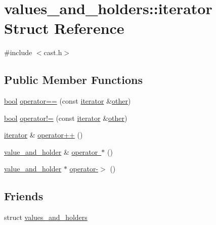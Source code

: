\hypertarget{structvalues__and__holders_1_1iterator}{}\section{values\+\_\+and\+\_\+holders\+::iterator Struct Reference}
\label{structvalues__and__holders_1_1iterator}


{\ttfamily \#include $<$cast.\+h$>$}

\subsection*{Public Member Functions}
\begin{DoxyCompactItemize}
\item 
\mbox{\hyperlink{asdl_8h_af6a258d8f3ee5206d682d799316314b1}{bool}} \mbox{\hyperlink{structvalues__and__holders_1_1iterator_a33067e3338236631faabd163015ecdeb}{operator==}} (const \mbox{\hyperlink{structvalues__and__holders_1_1iterator}{iterator}} \&\mbox{\hyperlink{dictobject_8h_abd4733e17e86acb453bda62bc8b96adf}{other}})
\item 
\mbox{\hyperlink{asdl_8h_af6a258d8f3ee5206d682d799316314b1}{bool}} \mbox{\hyperlink{structvalues__and__holders_1_1iterator_add38e28c3781eb444bede073da2f0161}{operator!=}} (const \mbox{\hyperlink{structvalues__and__holders_1_1iterator}{iterator}} \&\mbox{\hyperlink{dictobject_8h_abd4733e17e86acb453bda62bc8b96adf}{other}})
\item 
\mbox{\hyperlink{structvalues__and__holders_1_1iterator}{iterator}} \& \mbox{\hyperlink{structvalues__and__holders_1_1iterator_a5c088cc278f41cbae555f831cbdf2e38}{operator++}} ()
\item 
\mbox{\hyperlink{structvalue__and__holder}{value\+\_\+and\+\_\+holder}} \& \mbox{\hyperlink{structvalues__and__holders_1_1iterator_af5c40b3f93b79766c8da58d6831bf161}{operator $\ast$}} ()
\item 
\mbox{\hyperlink{structvalue__and__holder}{value\+\_\+and\+\_\+holder}} $\ast$ \mbox{\hyperlink{structvalues__and__holders_1_1iterator_a0a40a308242db92fb8a847159a8a90ff}{operator-\/$>$}} ()
\end{DoxyCompactItemize}
\subsection*{Friends}
\begin{DoxyCompactItemize}
\item 
struct \mbox{\hyperlink{structvalues__and__holders_1_1iterator_a69240ad74e4283727c7dcb5c6fea589e}{values\+\_\+and\+\_\+holders}}
\end{DoxyCompactItemize}


